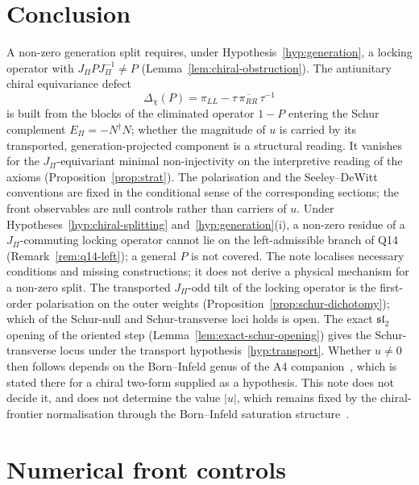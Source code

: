 \documentclass[11pt]{article}
\theoremstyle{definition}
\newcommand{\EPi}{E_\Pi}
\begin{document}
  \section{Conclusion}
    \label{sec:conclusion}

    A non-zero generation split requires, under Hypothesis~\ref{hyp:generation}, a locking operator with
    $J_\Pi PJ_\Pi^{-1}\neq P$ (Lemma~\ref{lem:chiral-obstruction}).
    The antiunitary chiral equivariance defect
    \[
      \Delta_\chi(P)=\pi_{LL}-\tau\,\overline{\pi_{RR}}\,\tau^{-1}
    \]
    is built from the blocks of the eliminated operator $1-P$ entering the Schur complement
    $\EPi=-N^{\dagger}N$; whether the magnitude of $u$ is carried by its transported, generation-projected component
    is a structural reading.
    It vanishes for the $J_\Pi$-equivariant minimal non-injectivity on the interpretive reading of the axioms
    (Proposition~\ref{prop:strat}).
    The polarisation and the Seeley--DeWitt conventions are fixed in the conditional sense of the corresponding
    sections; the front observables are null controls rather than carriers of $u$.
    Under Hypotheses~\ref{hyp:chiral-splitting} and~\ref{hyp:generation}(i), a non-zero residue of a $J_\Pi$-commuting
    locking operator cannot lie on the left-admissible branch of Q14 (Remark~\ref{rem:q14-left}); a general $P$ is
    not covered.
    The note localises necessary conditions and missing constructions; it does not derive a physical mechanism for a
    non-zero split.
    The transported $J_\Pi$-odd tilt of the locking operator is the first-order polarisation on the outer weights
    (Proposition~\ref{prop:schur-dichotomy}); which of the Schur-null and Schur-transverse loci holds is open.
    The exact $\mathfrak{sl}_2$ opening of the oriented step (Lemma~\ref{lem:exact-schur-opening}) gives
    the Schur-transverse locus under the transport hypothesis~\ref{hyp:transport}.
    Whether $u\neq0$ then follows depends on the Born--Infeld genus of the A4 companion~\cite{Beau2026bim}, which is
    stated there for a chiral two-form supplied as a hypothesis.
    This note does not decide it, and does not determine the value $|u|$, which remains fixed by the chiral-frontier
    normalisation through the Born--Infeld saturation structure~\cite{Beau2026c}.

    \appendix
  \section{Numerical front controls}
    \label{sec:controls}
\end{document}
